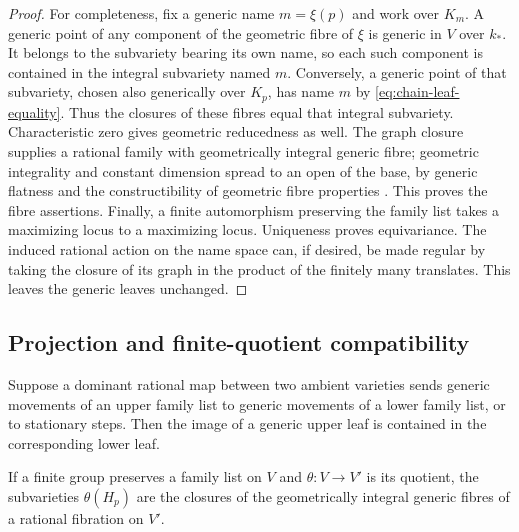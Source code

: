 \begin{proof}
For completeness, fix a generic name $m=\xi(p)$ and work over $K_m$.
A generic point of any component of the geometric fibre of $\xi$ is
generic in $V$ over $k_*$.  It belongs to the subvariety bearing its own
name, so each such component is contained in the integral subvariety
named $m$.  Conversely, a generic point of that subvariety, chosen also
generically over $K_p$, has name $m$ by
\eqref{eq:chain-leaf-equality}.  Thus the closures of these fibres equal
that integral subvariety.  Characteristic zero gives geometric
reducedness as well.  The graph closure supplies a rational family with
geometrically integral generic fibre; geometric integrality and constant
dimension spread to an open of the base, by generic flatness and the
constructibility of geometric fibre properties
\cite[\S\S9,12]{EGAIV3}.  This proves the fibre assertions.  Finally, a
finite automorphism preserving the family list takes a maximizing locus
to a maximizing locus.  Uniqueness proves equivariance.  The induced rational action on the
name space can, if desired, be made regular by taking the closure of its
graph in the product of the finitely many translates.  This leaves the
generic leaves unchanged.
\end{proof}

\subsection{Projection and finite-quotient compatibility}

\begin{corollary}\label{cor:chain-functoriality}
Suppose a dominant rational map between two ambient varieties sends
generic movements of an upper family list to generic movements of a
lower family list, or to stationary steps.  Then the image of a generic
upper leaf is contained in the corresponding lower leaf.

If a finite group preserves a family list on $V$ and
$\theta:V\to V'$ is its quotient, the subvarieties
$\theta(H_p)$ are the closures of the geometrically integral generic
fibres of a rational fibration on $V'$.
\end{corollary}

